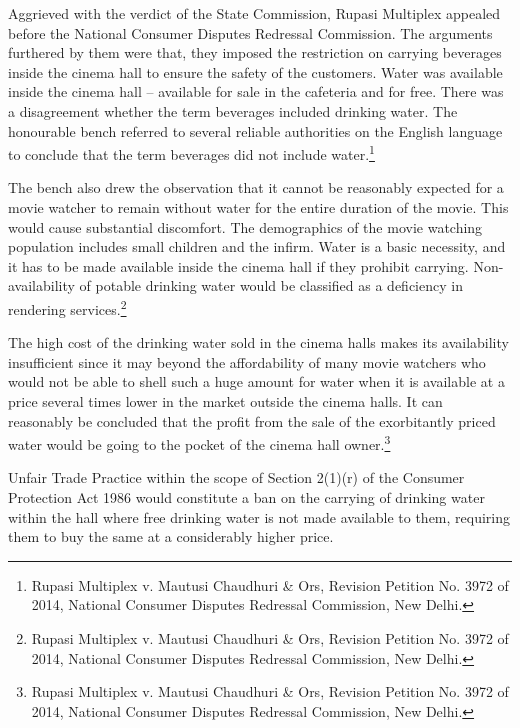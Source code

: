 \begin{multicols}{2}
\vspace{-.1cm}

\noi
Aggrieved with the verdict of the State Commission, Rupasi Multiplex appealed before the
National Consumer Disputes Redressal Commission. The arguments furthered by them were
that, they imposed the restriction on carrying beverages inside the cinema hall to ensure the
safety of the customers. Water was available inside the cinema hall – available for sale in the
cafeteria and for free. There was a disagreement whether the term beverages included drinking
water. The honourable bench referred to several reliable authorities on the English language to
conclude that the term beverages did not include water.\footnote{Rupasi Multiplex v. Mautusi Chaudhuri \& Ors, Revision Petition No. 3972 of 2014, National Consumer Disputes Redressal Commission, New Delhi.}

\vspace{-.1cm}

\noi
The bench also drew the observation that it cannot be reasonably expected for a movie watcher
to remain without water for the entire duration of the movie. This would cause substantial
discomfort. The demographics of the movie watching population includes small children and
the infirm. Water is a basic necessity, and it has to be made available inside the cinema hall if
they prohibit carrying. Non-availability of potable drinking water would be classified as a
deficiency in rendering services.\footnote{Rupasi Multiplex v. Mautusi Chaudhuri \& Ors, Revision Petition No. 3972 of 2014, National Consumer Disputes Redressal Commission, New Delhi.}

\vspace{-.1cm}

\noi
The high cost of the drinking water sold in the cinema halls makes its availability insufficient
since it may beyond the affordability of many movie watchers who would not be able to shell
such a huge amount for water when it is available at a price several times lower in the market
outside the cinema halls. It can reasonably be concluded that the profit from the sale of the
exorbitantly priced water would be going to the pocket of the cinema hall owner.\footnote{Rupasi Multiplex v. Mautusi Chaudhuri \& Ors, Revision Petition No. 3972 of 2014, National Consumer Disputes Redressal Commission, New Delhi.}

\vspace{-.1cm}

\noi
Unfair Trade Practice within the scope of Section 2(1)(r) of the Consumer Protection Act 1986
would constitute a ban on the carrying of drinking water within the hall where free drinking
water is not made available to them, requiring them to buy the same at a considerably higher
price.


\end{multicols}
